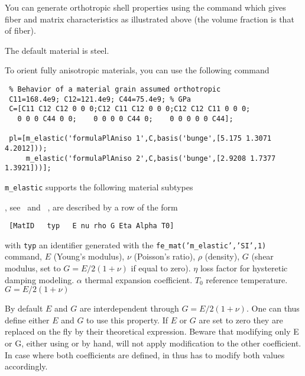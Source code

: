 You can generate orthotropic shell properties using the  command which gives fiber and matrix characteristics as illustrated above (the volume fraction is that of fiber). 

The default material is steel.


To orient fully anisotropic materials, you can use the following command

\begin{verbatim}
 % Behavior of a material grain assumed orthotropic
 C11=168.4e9; C12=121.4e9; C44=75.4e9; % GPa
 C=[C11 C12 C12 0 0 0;C12 C11 C12 0 0 0;C12 C12 C11 0 0 0;
   0 0 0 C44 0 0;    0 0 0 0 C44 0;    0 0 0 0 0 C44]; 

 pl=[m_elastic('formulaPlAniso 1',C,basis('bunge',[5.175 1.3071 4.2012]));
     m_elastic('formulaPlAniso 2',C,basis('bunge',[2.9208 1.7377 1.3921]))];
\end{verbatim}%


{\tt m\_elastic} supports the following material subtypes\vs\vs


, see~ and ~, are described by a row of the form

\begin{verbatim}
 [MatID   typ   E nu rho G Eta Alpha T0]
\end{verbatim}


\noindent with {\tt typ} an identifier generated with the {\tt fe\_mat('m\_elastic','SI',1)} command, $E$ (Young's modulus), $\nu$ (Poisson's ratio), 
$\rho$ (density), $G$ (shear modulus, set to $G=E/2(1+\nu)$ if equal to zero). $\eta$ loss factor for hysteretic damping modeling. $\alpha$ thermal expansion coefficient. $T_0$ reference temperature.
$G=E/2(1+\nu)$

By default $E$ and $G$ are interdependent through $G=E/2(1+\nu)$. One can thus define either $E$ and $G$ to use this property. If $E$ or $G$ are set to zero they are replaced on the fly by their theoretical expression. Beware that modifying only E or G, either using \feutil {} or by hand, will not apply modification to the other coefficient. In case where both coefficients are defined, in thus has to modify both values accordingly.



